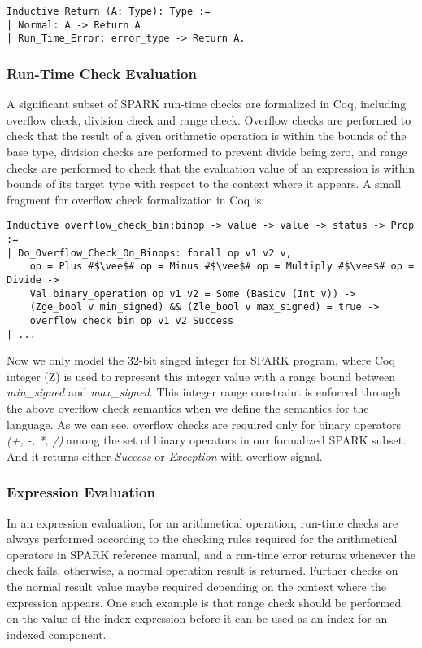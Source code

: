 \begin{lstlisting}[escapechar=\#, language=coq, basicstyle=\small]
Inductive Return (A: Type): Type :=
| Normal: A -> Return A
| Run_Time_Error: error_type -> Return A.
\end{lstlisting}

\subsubsection{Run-Time Check Evaluation}
A significant subset of SPARK run-time checks are formalized in Coq,
including overflow check, division check and range check. Overflow checks are
performed to check that the result of a given orithmetic operation is within the
bounds of the base type, division checks are performed to prevent divide being
zero, and range checks are performed to check that the evaluation value of an
expression is within bounds of its target type with respect to the context where
it appears. A small fragment for overflow check formalization in Coq is:
\begin{lstlisting}[escapechar = \#, language=coq, basicstyle=\small]
Inductive overflow_check_bin:binop -> value -> value -> status -> Prop :=
| Do_Overflow_Check_On_Binops: forall op v1 v2 v, 
    op = Plus #$\vee$# op = Minus #$\vee$# op = Multiply #$\vee$# op = Divide ->
    Val.binary_operation op v1 v2 = Some (BasicV (Int v)) ->
    (Zge_bool v min_signed) && (Zle_bool v max_signed) = true ->  
    overflow_check_bin op v1 v2 Success
| ...
\end{lstlisting}
Now we only model the 32-bit singed integer for SPARK program, where Coq integer
(Z) is used to represent this integer value with a range bound between \textit{min\_signed}
and \textit{max\_signed}. This integer range constraint is enforced through
the above overflow check semantics when we define the semantics for the
language. As we can see, overflow checks are required only for binary operators
\textit{(+, -, *, /)} among the set of binary operators in our formalized SPARK
subset. And it returns either \textit{Success} or \textit{Exception} with
overflow signal.

\subsubsection{Expression Evaluation}
In an expression evaluation, for an arithmetical operation, run-time checks are
always performed according to the checking rules required for the arithmetical
operators in SPARK reference manual, and a run-time error returns whenever the
check fails, otherwise, a normal operation result is returned. Further checks on
the normal result value maybe required depending on the context where the
expression appears. One such example is that range check should be performed on
the value of the index expression before it can be used as an index for an
indexed component.

